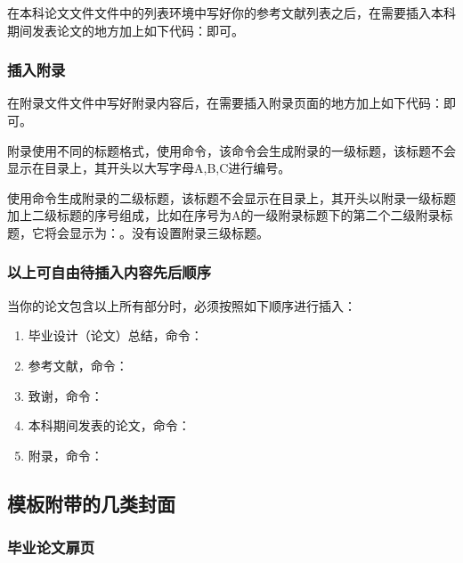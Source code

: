 \documentclass{nitthesis}
\begin{document}
在本科论文文件文件中的列表环境中写好你的参考文献列表之后，在需要插入本科期间发表论文的地方加上如下代码：即可。

\subsubsection{插入附录}

在附录文件文件中写好附录内容后，在需要插入附录页面的地方加上如下代码：即可。

附录使用不同的标题格式，使用命令，该命令会生成附录的一级标题，该标题不会显示在目录上，其开头以大写字母A,B,C进行编号。

使用命令生成附录的二级标题，该标题不会显示在目录上，其开头以附录一级标题加上二级标题的序号组成，比如在序号为A的一级附录标题下的第二个二级附录标题，它将会显示为：。没有设置附录三级标题。

\subsubsection{以上可自由待插入内容先后顺序}

当你的论文包含以上所有部分时，必须按照如下顺序进行插入：

\begin{enumerate}
    \item 毕业设计（论文）总结，命令：
    \item 参考文献，命令：
    \item 致谢，命令：
    \item 本科期间发表的论文，命令：
    \item 附录，命令：
\end{enumerate}

\subsection{模板附带的几类封面}

\subsubsection{毕业论文扉页}
\end{document}
